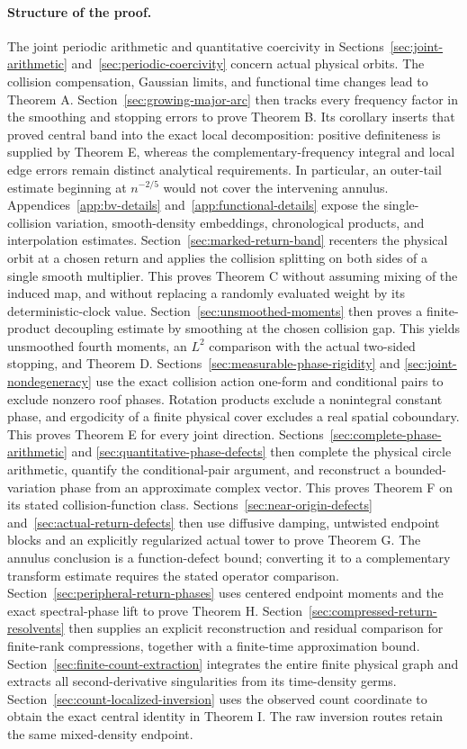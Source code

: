 \documentclass[11pt,reqno]{amsart}
\numberwithin{equation}{section}
\theoremstyle{definition}\newtheorem{definition}[theorem]{Definition}
\theoremstyle{remark}\newtheorem{remark}[theorem]{Remark}
\begin{document}
\paragraph{Structure of the proof.}
The joint periodic arithmetic and quantitative coercivity in
Sections~\ref{sec:joint-arithmetic} and~\ref{sec:periodic-coercivity}
concern actual physical orbits. The collision compensation, Gaussian
limits, and functional time changes lead to Theorem A.
Section~\ref{sec:growing-major-arc} then tracks every frequency factor
in the smoothing and stopping errors to prove Theorem B. Its corollary
inserts that proved central band into the exact local decomposition:
positive definiteness is supplied by Theorem E, whereas the
complementary-frequency integral and local edge errors remain distinct
analytical requirements. In particular, an outer-tail
estimate beginning at $n^{-2/5}$ would not cover the intervening annulus.
Appendices~\ref{app:bv-details} and~\ref{app:functional-details} expose
the single-collision variation, smooth-density embeddings,
chronological products, and interpolation estimates. Section~\ref{sec:marked-return-band} recenters the physical orbit at a
chosen return and applies the collision splitting on both sides of a
single smooth multiplier. This proves Theorem C without assuming
mixing of the induced map, and without replacing a randomly evaluated
weight by its deterministic-clock value. Section~\ref{sec:unsmoothed-moments} then proves a finite-product
decoupling estimate by smoothing at the chosen collision gap. This
yields unsmoothed fourth moments, an $L^2$ comparison with the actual
two-sided stopping, and Theorem D.
Sections~\ref{sec:measurable-phase-rigidity} and
\ref{sec:joint-nondegeneracy} use the exact collision action one-form
and conditional pairs to exclude nonzero roof phases. Rotation products
exclude a nonintegral constant phase, and ergodicity of a finite physical
cover excludes a real spatial coboundary. This proves Theorem E for
every joint direction. Sections~\ref{sec:complete-phase-arithmetic} and
\ref{sec:quantitative-phase-defects} then complete the physical circle
arithmetic, quantify the conditional-pair argument, and reconstruct a
bounded-variation phase from an approximate complex vector. This proves
Theorem F on its stated collision-function class.
Sections~\ref{sec:near-origin-defects} and~\ref{sec:actual-return-defects}
then use diffusive damping, untwisted endpoint blocks and an explicitly
regularized actual tower to prove Theorem G. The annulus conclusion is
a function-defect bound; converting it to a complementary transform
estimate requires the stated operator comparison.
Section~\ref{sec:peripheral-return-phases} uses centered endpoint
moments and the exact spectral-phase lift to prove Theorem H.
Section~\ref{sec:compressed-return-resolvents} then supplies an explicit
reconstruction and residual comparison for finite-rank compressions,
together with a finite-time approximation bound.
Section~\ref{sec:finite-count-extraction} integrates the entire finite
physical graph and extracts all second-derivative singularities from its
time-density germs. Section~\ref{sec:count-localized-inversion} uses
the observed count coordinate to obtain the exact central identity in
Theorem I. The raw inversion routes retain the same mixed-density endpoint.
\end{document}
